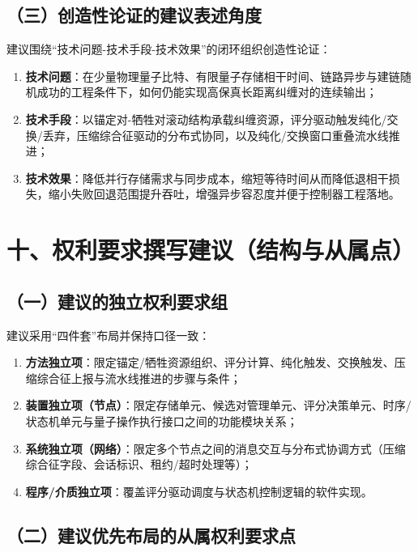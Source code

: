\documentclass[12pt,a4paper]{article}
\begin{document}
\subsection*{（三）创造性论证的建议表述角度}

建议围绕“技术问题-技术手段-技术效果”的闭环组织创造性论证：
\begin{enumerate}[label=(\arabic*)]
    \item \textbf{技术问题}：在少量物理量子比特、有限量子存储相干时间、链路异步与建链随机成功的工程条件下，如何仍能实现高保真长距离纠缠对的连续输出；
    \item \textbf{技术手段}：以锚定对-牺牲对滚动结构承载纠缠资源，评分驱动触发纯化/交换/丢弃，压缩综合征驱动的分布式协同，以及纯化/交换窗口重叠流水线推进；
    \item \textbf{技术效果}：降低并行存储需求与同步成本，缩短等待时间从而降低退相干损失，缩小失败回退范围提升吞吐，增强异步容忍度并便于控制器工程落地。
\end{enumerate}

\section*{十、权利要求撰写建议（结构与从属点）}

\subsection*{（一）建议的独立权利要求组}

建议采用“四件套”布局并保持口径一致：
\begin{enumerate}[label=(\arabic*)]
    \item \textbf{方法独立项}：限定锚定/牺牲资源组织、评分计算、纯化触发、交换触发、压缩综合征上报与流水线推进的步骤与条件；
    \item \textbf{装置独立项（节点）}：限定存储单元、候选对管理单元、评分决策单元、时序/状态机单元与量子操作执行接口之间的功能模块关系；
    \item \textbf{系统独立项（网络）}：限定多个节点之间的消息交互与分布式协调方式（压缩综合征字段、会话标识、租约/超时处理等）；
    \item \textbf{程序/介质独立项}：覆盖评分驱动调度与状态机控制逻辑的软件实现。
\end{enumerate}

\subsection*{（二）建议优先布局的从属权利要求点}
\end{document}
